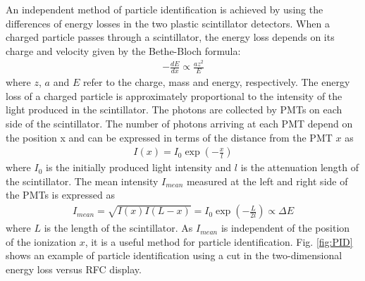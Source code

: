 An independent method of particle identification is achieved by using the differences of energy losses in the two plastic scintillator detectors. When a charged particle passes through a scintillator, the energy loss depends on its charge and velocity given by the Bethe-Bloch formula:
\begin{equation}
    \label{eq:BB_formula}
    \begin{aligned}
    -\frac{dE}{dx} \propto \frac{az^2}{E}
    \end{aligned}
\end{equation}
where $z$, $a$ and $E$ refer to  the charge, mass and energy, respectively.  The energy loss of a charged particle is approximately proportional to the intensity of the light produced in the scintillator. The photons are collected by PMTs on each side of the scintillator. The number of photons arriving at each PMT depend on the position x and can be expressed in terms of the distance from the PMT $x$  as
\begin{equation}
    \label{eq:intensity}
    \begin{aligned}
    I(x) = I_0 \exp(-\frac{x}{l})
    \end{aligned}
\end{equation}
where $I_0$ is the initially produced light intensity and $l$ is the attenuation length of the scintillator. The mean intensity $I_{mean}$ measured at the left and right side of the PMTs is  expressed as
\begin{equation}
    \label{eq:intensity_mean}
    \begin{aligned}
    I_{mean} = \sqrt{I(x)I(L-x)} = I_0 \exp(-\frac{L}{2l}) \propto \Delta E
    \end{aligned}
\end{equation}
where $L$ is the length of the scintillator. As $I_{mean}$ is independent of the position of the ionization $x$, it is a useful method for particle identification. Fig. \ref{fig:PID} shows an example of particle identification using a cut in the  two-dimensional energy loss versus RFC display.


